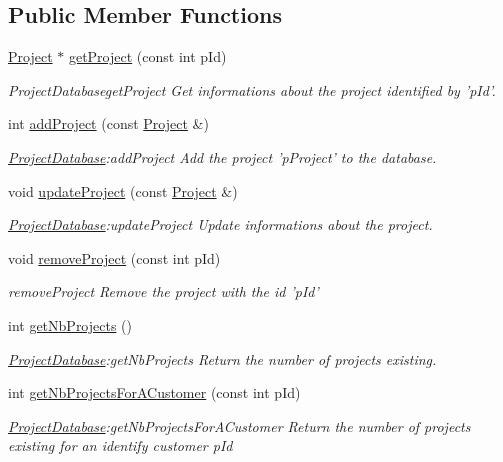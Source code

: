\subsection*{Public Member Functions}
\begin{DoxyCompactItemize}
\item 
\hyperlink{classProject}{Project} $\ast$ \hyperlink{classProjectDatabase_a895c03003dc4deea0bc429776337795f}{get\+Project} (const int p\+Id)
\begin{DoxyCompactList}\small\item\em Project\+Databaseget\+Project Get informations about the project identified by 'p\+Id'. \end{DoxyCompactList}\item 
int \hyperlink{classProjectDatabase_a3e2c3d198f7f5724ae0388fd49f4e8cb}{add\+Project} (const \hyperlink{classProject}{Project} \&)
\begin{DoxyCompactList}\small\item\em \hyperlink{classProjectDatabase}{Project\+Database}\+:add\+Project Add the project 'p\+Project' to the database. \end{DoxyCompactList}\item 
\hypertarget{classProjectDatabase_a959b2f9617969277a8c92a8239c613f1}{void \hyperlink{classProjectDatabase_a959b2f9617969277a8c92a8239c613f1}{update\+Project} (const \hyperlink{classProject}{Project} \&)}\label{classProjectDatabase_a959b2f9617969277a8c92a8239c613f1}

\begin{DoxyCompactList}\small\item\em \hyperlink{classProjectDatabase}{Project\+Database}\+:update\+Project Update informations about the project. \end{DoxyCompactList}\item 
void \hyperlink{classProjectDatabase_a52f3c3b312c418568531eb4cd2ecf615}{remove\+Project} (const int p\+Id)
\begin{DoxyCompactList}\small\item\em remove\+Project Remove the project with the id 'p\+Id' \end{DoxyCompactList}\item 
int \hyperlink{classProjectDatabase_a48ab28fa18bc3f0371f8c17c5421a46e}{get\+Nb\+Projects} ()
\begin{DoxyCompactList}\small\item\em \hyperlink{classProjectDatabase}{Project\+Database}\+:get\+Nb\+Projects Return the number of projects existing. \end{DoxyCompactList}\item 
int \hyperlink{classProjectDatabase_a3dbf2e270674727fc479d392c6609dec}{get\+Nb\+Projects\+For\+A\+Customer} (const int p\+Id)
\begin{DoxyCompactList}\small\item\em \hyperlink{classProjectDatabase}{Project\+Database}\+:get\+Nb\+Projects\+For\+A\+Customer Return the number of projects existing for an identify customer {\itshape p\+Id} \end{DoxyCompactList}\end{DoxyCompactItemize}
